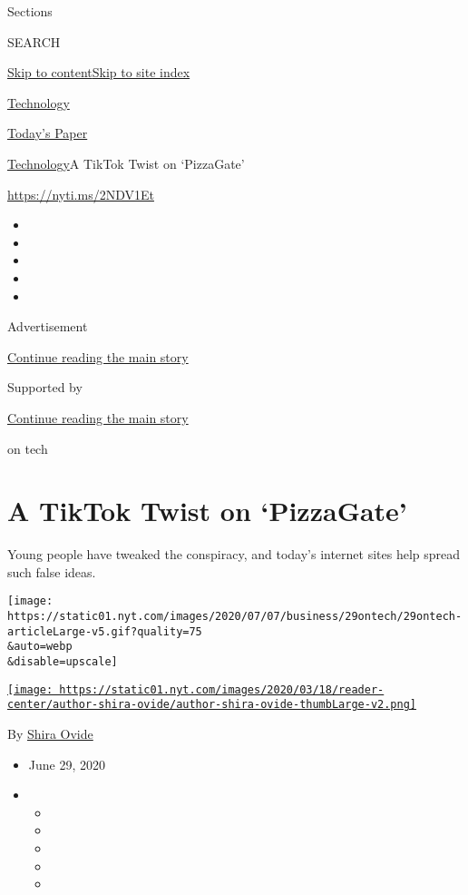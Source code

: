 Sections

SEARCH

\protect\hyperlink{site-content}{Skip to
content}\protect\hyperlink{site-index}{Skip to site index}

\href{https://www.nytimes.com/section/technology}{Technology}

\href{https://myaccount.nytimes.com/auth/login?response_type=cookie\&client_id=vi}{}

\href{https://www.nytimes.com/section/todayspaper}{Today's Paper}

\href{/section/technology}{Technology}\textbar{}A TikTok Twist on
`PizzaGate'

\url{https://nyti.ms/2NDV1Et}

\begin{itemize}
\item
\item
\item
\item
\item
\end{itemize}

Advertisement

\protect\hyperlink{after-top}{Continue reading the main story}

Supported by

\protect\hyperlink{after-sponsor}{Continue reading the main story}

on tech

\hypertarget{a-tiktok-twist-on-pizzagate}{%
\section{A TikTok Twist on
`PizzaGate'}\label{a-tiktok-twist-on-pizzagate}}

Young people have tweaked the conspiracy, and today's internet sites
help spread such false ideas.

\texttt{[image: https://static01.nyt.com/images/2020/07/07/business/29ontech/29ontech-articleLarge-v5.gif?quality=75\\\&auto=webp\\\&disable=upscale]}

\href{https://www.nytimes.com/by/shira-ovide}{\texttt{[image: https://static01.nyt.com/images/2020/03/18/reader-center/author-shira-ovide/author-shira-ovide-thumbLarge-v2.png]}}

By \href{https://www.nytimes.com/by/shira-ovide}{Shira Ovide}

\begin{itemize}
\item
  June 29, 2020
\item
  \begin{itemize}
  \item
  \item
  \item
  \item
  \item
  \end{itemize}
\end{itemize}

